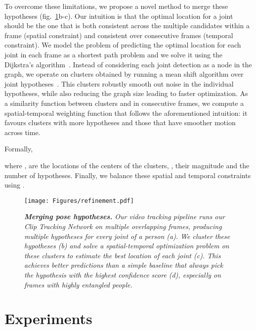 \documentclass[10pt,twocolumn,letterpaper]{article}
\begin{document}
To overcome these limitations, we propose a novel method to merge these hypotheses (fig.~\ref{fig:refinement}{\color{red}b-c}). Our intuition is that the optimal location for a joint should be the one that is both consistent across the multiple candidates within a frame (spatial constraint) and consistent over consecutive frames (temporal constraint). 
We model the problem of predicting the optimal location for each joint in each frame as a shortest path problem and we solve it using the Dijkstra's algorithm~\cite{dijkstra1959note}. Instead of considering each joint detection as a node in the graph, we operate on clusters obtained by running a mean shift algorithm over joint hypotheses~\cite{comaniciu2002mean}. 
This clusters robustly smooth out noise in the individual hypotheses, while also reducing the graph size leading to faster optimization.
As a similarity function  between clusters  and  in consecutive frames, we compute a spatial-temporal weighting function that follows the aforementioned intuition: it favours clusters with more hypotheses  and those that have smoother motion across time. 

Formally,

\vspace{-4mm}


\noindent where ,  are the locations of the centers of the clusters, ,  their magnitude and  the number of hypotheses. Finally, we balance these spatial and temporal constraints using . 
 
 \begin{figure}
 	\begin{center}
    	\texttt{[image: Figures/refinement.pdf]}
	\end{center}
	\vspace{-7mm}
    	\caption{\small \it {\bf Merging pose hypotheses.} Our video tracking pipeline runs our Clip Tracking Network on multiple overlapping frames, producing multiple hypotheses for every joint of a person (a). We cluster these hypotheses (b) and solve a spatial-temporal optimization problem on these clusters to estimate the best location of each joint (c). This achieves better predictions than a simple baseline that always pick the hypothesis with the highest confidence score (d), especially on frames with highly entangled people.\vspace{-4mm}}
    \label{fig:refinement}
\end{figure}

\section{Experiments}\label{sec:exp}
\end{document}

